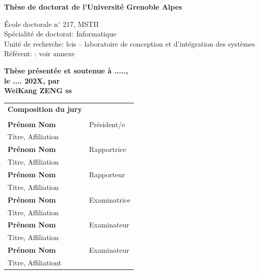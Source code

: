 \documentclass[french,12pt,a4paper]{book}
\begin{document}
\begin{titlepage}

\vspace{1.5cm}
\normalsize

\textbf{Thèse de doctorat de l'Université Grenoble Alpes}


\vspace{15mm}

École doctorale n$^{\circ}$ 217, MSTII\\
\small Spécialité de doctorat: Informatique\\
\footnotesize Unité de recherche: lcis – laboratoire de conception et d'intégration des systèmes\\
\footnotesize Référent: : voir annexe
\vspace{15mm}

\textbf{Thèse présentée et soutenue à .....,\\ le .... 202X, par}\\
\bigskip
\Large {\color{orange} \textbf{WeiKang ZENG ss}}


\vspace{\fill} %

\bigskip

\flushleft

\scriptsize
\begin{tabular}{|p{7cm}l}
\arrayrulecolor{orange}
{\footnotesize \textbf{Composition du jury}}\\
& \\
\textbf{Prénom Nom} &   Président/e\\ 
Titre, Affiliation & \\
\textbf{Prénom Nom} &  Rapportrice \\ 
Titre, Affiliation   &   \\ 
\textbf{Prénom Nom} &  Rapporteur \\ 
Titre, Affiliation  &   \\ 
\textbf{Prénom Nom} &  Examinatrice \\ 
Titre, Affiliation   &   \\ 
\textbf{Prénom Nom} &  Examinateur \\ 
Titre, Affiliation   &   \\ 
\textbf{Prénom Nom} &  Examinateur \\ 
Titre, Affiliationt   &   \\ 


\end{tabular}
\end{titlepage}
\end{document}
